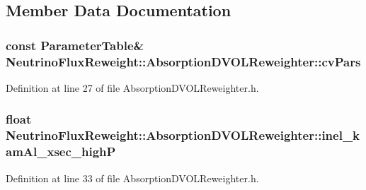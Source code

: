 \subsection{Member Data Documentation}
\hypertarget{class_neutrino_flux_reweight_1_1_absorption_d_v_o_l_reweighter_a9eab93b31a22145ef9fa33a877dbf02e}{
\subsubsection[{cv\-Pars}]{\setlength{\rightskip}{0pt plus 5cm}const {\bf Parameter\-Table}\& Neutrino\-Flux\-Reweight\-::\-Absorption\-D\-V\-O\-L\-Reweighter\-::cv\-Pars}}\label{class_neutrino_flux_reweight_1_1_absorption_d_v_o_l_reweighter_a9eab93b31a22145ef9fa33a877dbf02e}


Definition at line 27 of file Absorption\-D\-V\-O\-L\-Reweighter.\-h.

\hypertarget{class_neutrino_flux_reweight_1_1_absorption_d_v_o_l_reweighter_a75a48086a64722329b58cd1e099933c4}{
\subsubsection[{inel\-\_\-kam\-Al\-\_\-xsec\-\_\-high\-P}]{\setlength{\rightskip}{0pt plus 5cm}float Neutrino\-Flux\-Reweight\-::\-Absorption\-D\-V\-O\-L\-Reweighter\-::inel\-\_\-kam\-Al\-\_\-xsec\-\_\-high\-P\hspace{0.3cm}{\ttfamily [private]}}}\label{class_neutrino_flux_reweight_1_1_absorption_d_v_o_l_reweighter_a75a48086a64722329b58cd1e099933c4}


Definition at line 33 of file Absorption\-D\-V\-O\-L\-Reweighter.\-h.

